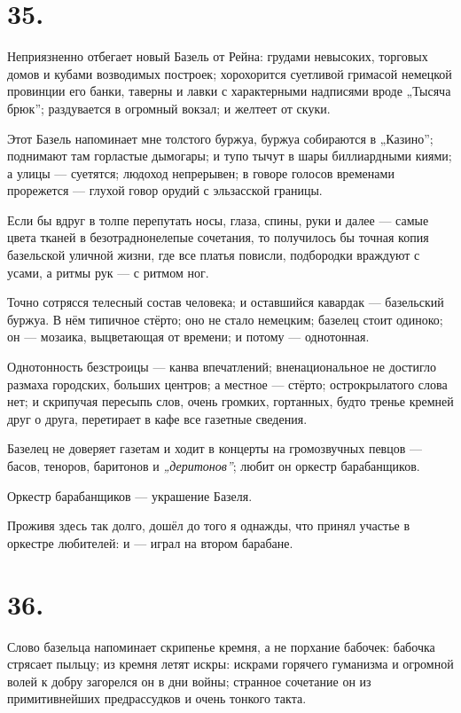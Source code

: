 \documentclass[12pt,a4paper,oneside]{book}
\begin{document}
\section*{35.}

Неприязненно отбегает новый Базель от Рейна: грудами невысоких, торговых домов и кубами возводимых построек; хорохорится суетливой гримасой немецкой провинции его банки, таверны и лавки с характерными надписями вроде „Тысяча брюк”; раздувается в огромный вокзал; и желтеет от скуки.

Этот Базель напоминает мне толстого буржуа, буржуа собираются в „Казино”; поднимают там горластые дымогары; и тупо тычут в шары биллиардными киями; а улицы — суетятся; людоход непрерывен; в говоре голосов временами прорежется — глухой говор орудий с эльзасской границы.

Если бы вдруг в толпе перепутать носы, глаза, спины, руки и далее — самые цвета тканей в безотраднонелепые сочетания, то получилось бы точная копия базельской уличной жизни, где все платья повисли, подбородки враждуют с усами, а ритмы рук — с ритмом ног.

Точно сотрясся телесный состав человека; и оставшийся кавардак — базельский буржуа. В нём типичное стёрто; оно не стало немецким; базелец стоит одиноко; он — мозаика, выцветающая от времени; и потому — однотонная.

Однотонность безстроицы — канва впечатлений; вненациональное не достигло размаха городских, больших центров; а местное — стёрто; острокрылатого слова нет; и скрипучая пересыпь слов, очень громких, гортанных, будто тренье кремней друг о друга, перетирает в кафе все газетные сведения.

Базелец не доверяет газетам и ходит в концерты на громозвучных певцов — басов, теноров, баритонов и \emph{„деритонов”}; любит он оркестр барабанщиков.

Оркестр барабанщиков — украшение Базеля.

Проживя здесь так долго, дошёл до того я однажды, что принял участье в оркестре любителей: и — играл на втором барабане.

\section*{36.}

Слово базельца напоминает скрипенье кремня, а не порхание бабочек: бабочка стрясает пыльцу; из кремня летят искры: искрами горячего гуманизма и огромной волей к добру загорелся он в дни войны; странное сочетание он из примитивнейших предрассудков и очень тонкого такта.
\end{document}
